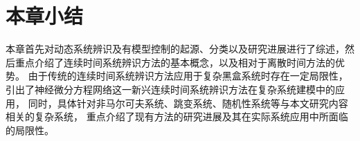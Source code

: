 \section{本章小结}
本章首先对动态系统辨识及有模型控制的起源、分类以及研究进展进行了综述，然后重点介绍了连续时间系统辨识方法的基本概念，以及相对于离散时间方法的优势。
由于传统的连续时间系统辨识方法应用于复杂黑盒系统时存在一定局限性，引出了神经微分方程网络这一新兴连续时间系统辨识方法在复杂系统建模中的应用，
同时，具体针对非马尔可夫系统、跳变系统、随机性系统等与本文研究内容相关的复杂系统，
重点介绍了现有方法的研究进展及其在实际系统应用中所面临的局限性。


